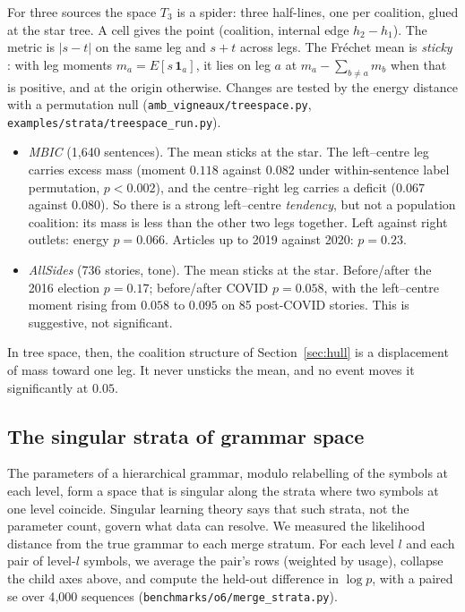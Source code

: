 \documentclass[11pt]{article}
\theoremstyle{definition}
\theoremstyle{remark}
\begin{document}
For three sources the space $T_3$ is a spider: three half-lines, one per coalition, glued at the star tree. A cell gives the point (coalition, internal edge $h_2-h_1$). The metric is $|s-t|$ on the same leg and $s+t$ across legs. The Fr\'echet mean is \emph{sticky} \cite{hotz}: with leg moments $m_a=E[s\,\mathbf1_a]$, it lies on leg $a$ at $m_a-\sum_{b\ne a}m_b$ when that is positive, and at the origin otherwise. Changes are tested by the energy distance \cite{szekely} with a permutation null (\texttt{amb\_vigneaux/treespace.py}, \texttt{examples/strata/treespace\_run.py}).
\begin{itemize}
  \item \emph{MBIC} (1{,}640 sentences). The mean sticks at the star. The left--centre leg carries excess mass (moment $0.118$ against $0.082$ under within-sentence label permutation, $p<0.002$), and the centre--right leg carries a deficit ($0.067$ against $0.080$). So there is a strong left--centre \emph{tendency}, but not a population coalition: its mass is less than the other two legs together. Left against right outlets: energy $p=0.066$. Articles up to 2019 against 2020: $p=0.23$.
  \item \emph{AllSides} (736 stories, tone). The mean sticks at the star. Before/after the 2016 election $p=0.17$; before/after COVID $p=0.058$, with the left--centre moment rising from $0.058$ to $0.095$ on 85 post-COVID stories. This is suggestive, not significant.
\end{itemize}
In tree space, then, the coalition structure of Section~\ref{sec:hull} is a displacement of mass toward one leg. It never unsticks the mean, and no event moves it significantly at $0.05$.

\subsection{The singular strata of grammar space}\label{sec:gram-strata}
The parameters of a hierarchical grammar, modulo relabelling of the symbols at each level, form a space that is singular along the strata where two symbols at one level coincide. Singular learning theory \cite{watanabe,wbic} says that such strata, not the parameter count, govern what data can resolve. We measured the likelihood distance from the true grammar to each merge stratum. For each level $l$ and each pair of level-$l$ symbols, we average the pair's rows (weighted by usage), collapse the child axes above, and compute the held-out difference in $\log p$, with a paired se over 4{,}000 sequences (\texttt{benchmarks/o6/merge\_strata.py}).
\end{document}

